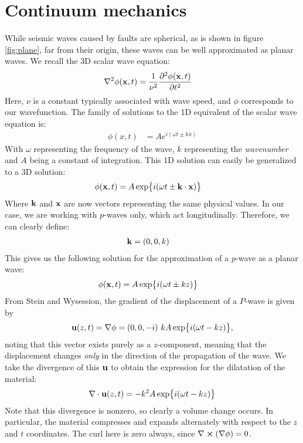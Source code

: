 \section{Continuum mechanics}
While seismic waves caused by faults are spherical, as is shown in figure \ref{fig:plane}, far from their origin, these waves can be well approximated as planar waves. We recall the 3D scalar wave equation:
\begin{align}
    \nabla^2 \phi(\vb{x}, t) &= \frac{1}{\nu^2}\frac{\partial ^2\phi(\vb{x}, t)}{\partial t^2}
\end{align}
Here, $\nu$ is a constant typically associated with wave speed, and $\phi$ corresponds to our wavefunction. The family of solutions to the 1D equivalent of the scalar wave equation is:
\begin{align}
    \phi(x,t) &= Ae^{i(\omega t\pm kx)}
\end{align}
With $\omega$ representing the frequency of the wave, $k$ representing the \textit{wavenumber} and $A$ being a constant of integration. This 1D solution can easily be generalized to a 3D solution:
\begin{align}
    \phi(\vb{x}, t) &= A\exp{i(\omega t \pm \vb{k}\cdot\vb{x})}
\end{align}
Where $\vb{k}$ and $\vb{x}$ are now vectors representing the same physical values. In our case, we are working with $p$-waves only, which act longitudinally. Therefore, we can clearly define:
\begin{align*}
    \vb{k} &= (0,0,k)
\end{align*}
This gives us the following solution for the approximation of a $p$-wave as a planar wave:
\begin{align}
    \phi(\vb{x}, t) &= A\exp{i(\omega t \pm kz)}
\end{align}
From Stein and Wysession,
the gradient of the displacement of a $P$-wave is given by
\begin{align}
    \vb{u}(z,t)=\nabla \phi = (0,0,-i)\ kA\exp{i(\omega t-kz)},
\end{align}
noting that this vector exists purely as a $z$-component, meaning that the displacement changes \textit{only} in the direction of the propagation of the wave.
We take the divergence of this $\vb{u}$ to obtain the expression for the dilatation of the material:
\begin{align}
    \nabla\cdot\vb{u}(z,t) = -k^2A\exp{i(\omega t-kz)}
\end{align}
Note that this divergence is nonzero, so clearly a volume change occurs. In particular, the material compresses and expands alternately with respect to the $z$ and $t$ coordinates. The curl here is zero always, since $\nabla\cross\del{\nabla\phi}=0$. 



